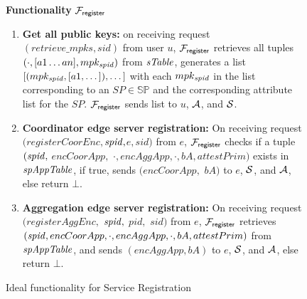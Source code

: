  



\addtocounter{figure}{-1}

\begin{figure}[h!]
\begin{mdframed}
\begin{center}
\textbf{Functionality} $\mathcal{F}_{\mathsf{register}}$
\end{center}

\begin{enumerate}\addtocounter{enumi}{9}%




\item \textbf{Get all public keys:} on receiving request $(retrieve\_mpks, sid)$ from user $u$,  $\mathcal{F}_{\mathsf{register}}$ retrieves all tuples $(\cdot,[a1 \dots an],mpk_{\mathit{spid}})$ from $\mathit{sTable}$, generates a list $[(mpk_{\mathit{spid}},[a1,\dots]),\dots]$ %
with each $mpk_{\mathit{spid}}$ in the list corresponding to an $SP \in \mathbb{SP}$ and the corresponding attribute list for the $SP$. $\mathcal{F}_{\mathsf{register}}$ sends list to $u$, $\mathcal{A}$, and $\mathcal{S}$.

\item \textbf{Coordinator edge server registration:} On receiving request $(registerCoorEnc$$,$$\mathit{spid},$$e,$$sid)$ from $e$, $\mathcal{F}_{\mathsf{register}}$ checks if a tuple $(\mathit{spid},$ $encCoorApp,$ $\cdot,$$encAggApp,$$\cdot,$$bA,$$attestPrim)$ exists in $\mathit{spAppTable}$, if true, sends $(encCoorApp,$ $bA)$ to $e$, $\mathcal{S}$, and $\mathcal{A}$, else return $\bot$. 

\item \textbf{Aggregation edge server registration:} %
On receiving request $(registerAggEnc,$ $\mathit{spid},$ $pid,$ $sid)$ from $e$, $\mathcal{F}_{\mathsf{register}}$ retrieves $(\mathit{spid}, encCoorApp,\cdot,encAggApp,\cdot,bA,attestPrim)$ from $\mathit{spAppTable}$,  %
and sends $(encAggApp,bA)$  to $e$, $\mathcal{S}$, and $\mathcal{A}$, else return $\bot$. 


\end{enumerate}
\end{mdframed}
\vspace{-0.15in}
\caption{Ideal functionality for Service Registration}
\label{fig:ucregister2}
\end{figure}


















